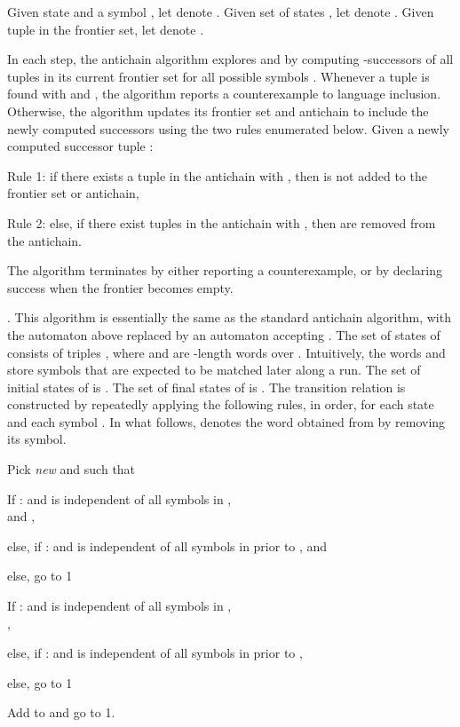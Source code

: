 Given state  and a symbol ,
let  denote .  Given set of states , let  denote .  
Given tuple  in the frontier set, let 
 denote . 

In each step, the antichain algorithm explores  and  by computing
-successors of all tuples in its current frontier set for all possible
symbols . Whenever a tuple  is found 
with  and ,
the algorithm reports a counterexample to language inclusion. Otherwise, the
algorithm updates its frontier set and antichain to include 
the newly computed successors using the two rules enumerated below. 
Given a newly computed successor tuple :
\begin{compactitem}
\item Rule 1: if there exists a tuple  in the antichain 
with , then  is not added to the frontier set or antichain,  
\item Rule 2: else, if there exist tuples  in the  antichain 
with , then  are removed from the antichain.
\end{compactitem}
The algorithm terminates by either reporting a counterexample, or by declaring
success when the frontier becomes empty.  

. 
This algorithm is essentially the same as the standard antichain algorithm, with 
the automaton  above replaced by an automaton 
 accepting . 
The set  of states of  consists of triples , 
where  and  are -length words over . 
Intuitively, the words  and  store symbols that are expected to be matched later along a run. 
The set of initial states of  is . 
The set of final states of  is  . 
The transition relation  is constructed by repeatedly applying the following rules, in order,  
for each state  and each symbol . In what follows,  
denotes the word obtained from  by removing its  symbol. 
\begin{compactenum}
\item Pick {\em new}  and  such that 
\item 
\begin{inparaenum}[(a)]
	\item If :  and 
         is independent of all symbols in , \\
         and ,
        \item else, if :   and 
	 is independent of all symbols in  prior to , 
         and 
        \item else, go to 1
   \end{inparaenum}
\item 
\begin{inparaenum}[(a)]
        \item If :  and
	 is independent of all symbols in ,\\
        , 
        \item else, if :  and 
	 is independent of all symbols in  prior to , 
	
	\item else, go to 1
\end{inparaenum}
\item Add  to  and go to 1.
\end{compactenum}


